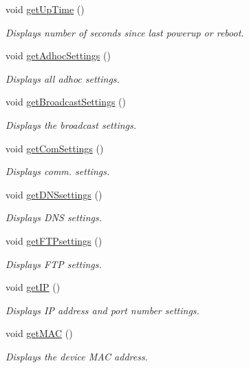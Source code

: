 \begin{DoxyCompactItemize}
void \hyperlink{class_wasp_w_i_f_i_ab0d369424fe9e9385e9dd1dafda7b2a9}{get\+Up\+Time} ()
\begin{DoxyCompactList}\small\item\em Displays number of seconds since last powerup or reboot. \end{DoxyCompactList}\item 
void \hyperlink{class_wasp_w_i_f_i_a70a646d082d8f2ccfd7adae5e35da783}{get\+Adhoc\+Settings} ()
\begin{DoxyCompactList}\small\item\em Displays all adhoc settings. \end{DoxyCompactList}\item 
void \hyperlink{class_wasp_w_i_f_i_a3734d59118c29037b33ec9b06370c5d6}{get\+Broadcast\+Settings} ()
\begin{DoxyCompactList}\small\item\em Displays the broadcast settings. \end{DoxyCompactList}\item 
void \hyperlink{class_wasp_w_i_f_i_a2816d0df0df9f12dd4806de249d6be0c}{get\+Com\+Settings} ()
\begin{DoxyCompactList}\small\item\em Displays comm. settings. \end{DoxyCompactList}\item 
void \hyperlink{class_wasp_w_i_f_i_a57c3aeb40fea0e50e9b8659ffbfd0000}{get\+D\+N\+Ssettings} ()
\begin{DoxyCompactList}\small\item\em Displays D\+NS settings. \end{DoxyCompactList}\item 
void \hyperlink{class_wasp_w_i_f_i_a333e9605cee4595bb1ba19448081ce24}{get\+F\+T\+Psettings} ()
\begin{DoxyCompactList}\small\item\em Displays F\+TP settings. \end{DoxyCompactList}\item 
void \hyperlink{class_wasp_w_i_f_i_a51d732a45a2561f4268a1baa7f73f3b1}{get\+IP} ()
\begin{DoxyCompactList}\small\item\em Displays IP address and port number settings. \end{DoxyCompactList}\item 
void \hyperlink{class_wasp_w_i_f_i_a15553c1a6a4e7e344d704d2bd03ae648}{get\+M\+AC} ()
\begin{DoxyCompactList}\small\item\em Displays the device M\+AC address. \end{DoxyCompactList}\item 

\end{DoxyCompactItemize}
